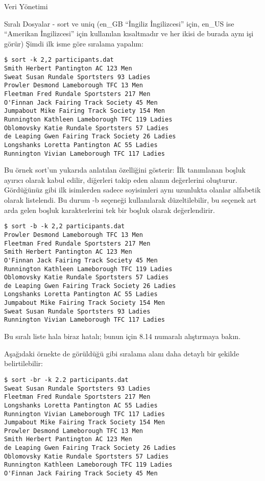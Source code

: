 \begin{section}{Veri Yönetimi}
\begin{subsection}{Sıralı Dosyalar - sort ve uniq}
(en\_GB “İngiliz İngilizcesi” için, en\_US ise “Amerikan İngilizcesi” için kullanılan kısaltmadır ve her ikisi de burada aynı işi görür) Şimdi ilk isme göre sıralama yapalım:

\footnotesize
\begin{verbatim}
$ sort -k 2,2 participants.dat
Smith Herbert Pantington AC 123 Men
Sweat Susan Rundale Sportsters 93 Ladies
Prowler Desmond Lameborough TFC 13 Men
Fleetman Fred Rundale Sportsters 217 Men
O'Finnan Jack Fairing Track Society 45 Men
Jumpabout Mike Fairing Track Society 154 Men
Runnington Kathleen Lameborough TFC 119 Ladies
Oblomovsky Katie Rundale Sportsters 57 Ladies
de Leaping Gwen Fairing Track Society 26 Ladies
Longshanks Loretta Pantington AC 55 Ladies
Runnington Vivian Lameborough TFC 117 Ladies
\end{verbatim}
\normalsize

Bu örnek sort'un yukarıda anlatılan özelliğini gösterir: İlk tanımlanan boşluk ayırıcı olarak kabul edilir, diğerleri takip eden alanın değerlerini oluşturur. Gördüğünüz gibi ilk isimlerden sadece soyisimleri aynı uzunlukta olanlar alfabetik olarak listelendi. Bu durum -b seçeneği kullanılarak düzeltilebilir, bu seçenek art arda gelen boşluk karakterlerini tek bir boşluk olarak değerlendirir.

\footnotesize
\begin{verbatim}
$ sort -b -k 2,2 participants.dat
Prowler Desmond Lameborough TFC 13 Men
Fleetman Fred Rundale Sportsters 217 Men
Smith Herbert Pantington AC 123 Men
O'Finnan Jack Fairing Track Society 45 Men
Runnington Kathleen Lameborough TFC 119 Ladies
Oblomovsky Katie Rundale Sportsters 57 Ladies
de Leaping Gwen Fairing Track Society 26 Ladies
Longshanks Loretta Pantington AC 55 Ladies
Jumpabout Mike Fairing Track Society 154 Men
Sweat Susan Rundale Sportsters 93 Ladies
Runnington Vivian Lameborough TFC 117 Ladies
\end{verbatim}
\normalsize

Bu sıralı liste hala biraz hatalı; bunun için 8.14 numaralı alıştırmaya bakın.

Aşağıdaki örnekte de görüldüğü gibi sıralama alanı daha detaylı bir şekilde belirtilebilir:

\footnotesize
\begin{verbatim}
$ sort -br -k 2.2 participants.dat
Sweat Susan Rundale Sportsters 93 Ladies
Fleetman Fred Rundale Sportsters 217 Men
Longshanks Loretta Pantington AC 55 Ladies
Runnington Vivian Lameborough TFC 117 Ladies
Jumpabout Mike Fairing Track Society 154 Men
Prowler Desmond Lameborough TFC 13 Men
Smith Herbert Pantington AC 123 Men
de Leaping Gwen Fairing Track Society 26 Ladies
Oblomovsky Katie Rundale Sportsters 57 Ladies
Runnington Kathleen Lameborough TFC 119 Ladies
O'Finnan Jack Fairing Track Society 45 Men
\end{verbatim}
\normalsize


\end{subsection}
\end{section}
